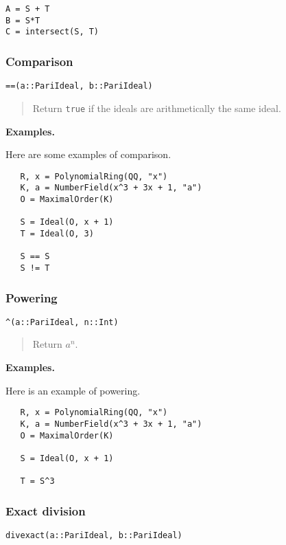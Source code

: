 \documentclass[a4paper,10pt]{article}
\newcommand{\code}{\lstinline}
\newcommand{\desc}[1]{\vspace{-3mm}\begin{quote}#1\end{quote}}
\begin{document}
{{\begin{lstlisting}
A = S + T
B = S*T
C = intersect(S, T)
\end{lstlisting}

\subsubsection{Comparison}

\begin{lstlisting}
==(a::PariIdeal, b::PariIdeal)
\end{lstlisting}

\desc{Return \code{true} if the ideals are arithmetically the same ideal.}

\textbf{Examples.}

Here are some examples of comparison.

\begin{lstlisting}
   R, x = PolynomialRing(QQ, "x")
   K, a = NumberField(x^3 + 3x + 1, "a")
   O = MaximalOrder(K)

   S = Ideal(O, x + 1)
   T = Ideal(O, 3)

   S == S
   S != T
\end{lstlisting}

\subsubsection{Powering}

\begin{lstlisting}
^(a::PariIdeal, n::Int)
\end{lstlisting}

\desc{Return $a^n$.}

\textbf{Examples.}

Here is an example of powering.

\begin{lstlisting}
   R, x = PolynomialRing(QQ, "x")
   K, a = NumberField(x^3 + 3x + 1, "a")
   O = MaximalOrder(K)

   S = Ideal(O, x + 1)
   
   T = S^3
\end{lstlisting}

\subsubsection{Exact division}

\begin{lstlisting}
divexact(a::PariIdeal, b::PariIdeal)
\end{lstlisting}

}}
\end{document}
